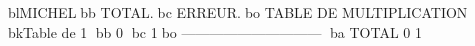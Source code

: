 blMICHELbb           TOTAL.bc      ERREUR.bo
TABLE DE MULTIPLICATION
bkTable de   1     bb  0	bc        1bo
------------------------------
ba TOTAL             0	        1
